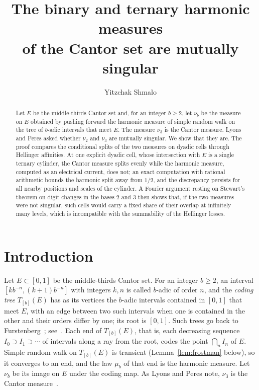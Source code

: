 \documentclass[11pt]{amsart}
\title[Binary and ternary harmonic measures of the Cantor set]{The binary and ternary harmonic measures\\ of the Cantor set are mutually singular}
\author{Yitzchak Shmalo}
\theoremstyle{remark}
\begin{document}
\begin{abstract}
Let $E$ be the middle-thirds Cantor set and, for an integer $b\ge 2$, let $\nu_b$ be the measure on $E$ obtained by pushing forward the harmonic measure of simple random walk on the tree of $b$-adic intervals that meet $E$. The measure $\nu_3$ is the Cantor measure. Lyons and Peres asked whether $\nu_2$ and $\nu_3$ are mutually singular. We show that they are. The proof compares the conditional splits of the two measures on dyadic cells through Hellinger affinities. At one explicit dyadic cell, whose intersection with $E$ is a single ternary cylinder, the Cantor measure splits evenly while the harmonic measure, computed as an electrical current, does not; an exact computation with rational arithmetic bounds the harmonic split away from $1/2$, and the discrepancy persists for all nearby positions and scales of the cylinder. A Fourier argument resting on Stewart's theorem on digit changes in the bases $2$ and $3$ then shows that, if the two measures were not singular, such cells would carry a fixed share of their overlap at infinitely many levels, which is incompatible with the summability of the Hellinger losses.
\end{abstract}

\maketitle

\section{Introduction}

Let $E\subset[0,1]$ be the middle-thirds Cantor set. For an integer $b\ge2$, an interval $[kb^{-n},(k+1)b^{-n}]$ with integers $k,n$ is called $b$-adic of order $n$, and the \emph{coding tree} $T_{[b]}(E)$ has as its vertices the $b$-adic intervals contained in $[0,1]$ that meet $E$, with an edge between two such intervals when one is contained in the other and their orders differ by one; its root is $[0,1]$. Such trees go back to Furstenberg~\cite{Furstenberg}; see~\cite[p.~15]{LP}. Each end of $T_{[b]}(E)$, that is, each decreasing sequence $I_0\supset I_1\supset\cdots$ of intervals along a ray from the root, codes the point $\bigcap_nI_n$ of $E$. Simple random walk on $T_{[b]}(E)$ is transient (Lemma~\ref{lem:frostman} below), so it converges to an end, and the law $\mu_b$ of that end is the harmonic measure. Let $\nu_b$ be its image on $E$ under the coding map. As Lyons and Peres note, $\nu_3$ is the Cantor measure~\cite[p.~542]{LP}.
\end{document}
